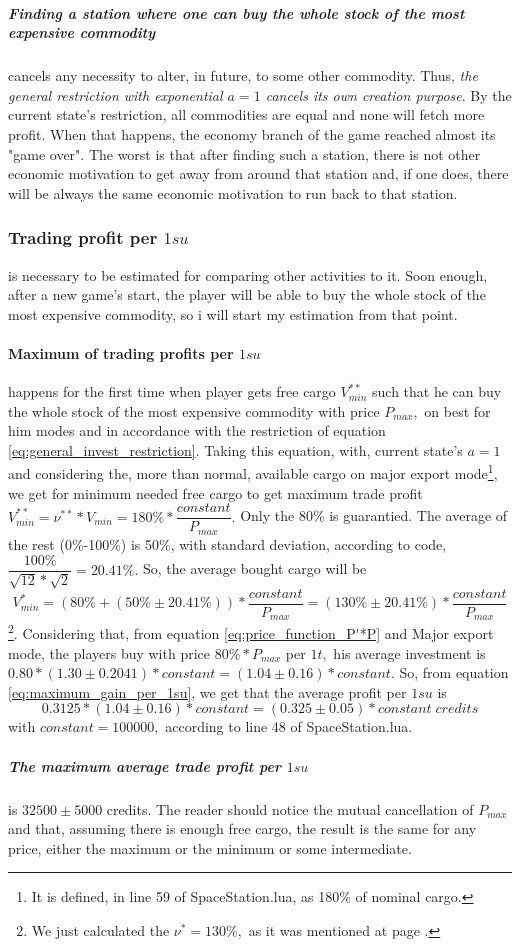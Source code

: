\documentclass[]{article}
\begin{document}
 \subparagraph*{Finding a station where one can buy the whole stock of the most expensive commodity} cancels any necessity to alter, in future, to some other commodity. Thus, \emph{the general restriction with exponential $a=1$ cancels its own creation purpose}. By the current state's restriction, all commodities are equal and none will fetch more profit. When that happens, the economy branch of the game reached almost its "game over". The worst is that after finding such a station, there is not other economic motivation to get away from around that station and, if one does, there will be always the same economic motivation to run back to that station.
 \subsubsection{Trading profit per $1su$} is necessary to be estimated for comparing other activities to it. Soon enough, after a new game's start, the player will be able to buy the whole stock of the most expensive commodity, so i will start my estimation from that point.
 \paragraph{Maximum of trading profits per $1su$} happens for the first time when player gets free cargo $V^{**}_{min}$ such that he can buy the whole stock of the most expensive commodity with price $P_{max},$ on best for him modes and in accordance with the restriction of equation \eqref{eq:general_invest_restriction}. Taking this equation, with, current state's $a=1$ and considering the, more than normal, available cargo on major export mode\footnote{It is defined, in line 59 of SpaceStation.lua, as 180\% of nominal cargo.}, we get for minimum needed free cargo to get maximum trade profit \(V^{**}_{min}=\nu^{**}*V_{min}=180\%*\dfrac{constant}{P_{max}}.\) Only the 80\% is guarantied. The average of the rest (0\%-100\%) is 50\%, with standard deviation, according to code,  $\dfrac{100\%}{\sqrt{12}*\sqrt{2}}=20.41\%.$\label{MajorExportDeviation} So, the average bought cargo\label{averageMajorCargo} will be 
 \[V^{*}_{min}=(80\%+(50\%\pm20.41\%))*\dfrac{constant}{P_{max}}=(130\%\pm20.41\%)*\dfrac{constant}{P_{max}}\]\footnote{We just calculated the $\nu^{*}=130\%,$ as it was mentioned at page \pageref{nominalStock}.}.\label{std_of_v} Considering that, from equation \eqref{eq:price_function_P'*P} and Major export mode, the players buy with price $80\%*P_{max}$ per $1t,$ his average investment is $0.80*(1.30\pm0.2041)*constant=(1.04\pm0.16)*constant.$ So, from equation \eqref{eq:maximum_gain_per_1su}, we get that the average profit per $1su$ is
 \[0.3125*(1.04\pm0.16)*constant=(0.325\pm0.05)*constant\; credits\] 
 with $constant=100000,$ according to line 48 of SpaceStation.lua.
 \subparagraph{The maximum average trade profit per $1su$} is $32500\pm5000$ credits.\label{maximumCurrentTradingProfit} The reader should notice the mutual cancellation of $P_{max}$ and that, assuming there is enough free cargo, the result is the same for any price, either the maximum or the minimum or some intermediate.
\end{document}
